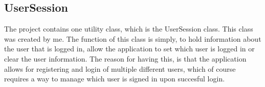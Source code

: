 \subsection*{UserSession}
The project contains one utility class, which is the UserSession class. This class was created by me. The function of this class is simply, to hold information about the user that is logged in, allow the application to set which user is logged in or clear the user information. The reason for having this, is that the application allows for registering and login of multiple different users, which of course requires a way to manage which user is signed in upon succesful login.
